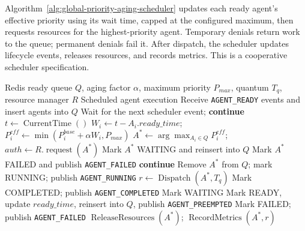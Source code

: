 Algorithm~\ref{alg:global-priority-aging-scheduler} updates each ready agent's effective priority using its wait time, capped at the configured maximum, then requests resources for the highest-priority agent. Temporary denials return work to the queue; permanent denials fail it. After dispatch, the scheduler updates lifecycle events, releases resources, and records metrics. This is a cooperative scheduler specification.
\vspace{\baselineskip}
\begin{algorithm}[H]
\caption{Global Priority-Aging Cooperative Agent Scheduler}

\label{alg:global-priority-aging-scheduler}
\begin{algorithmic}[1]
\Require Redis ready queue $Q$, aging factor $\alpha$, maximum priority $P_{max}$, quantum $T_q$, resource manager $R$
\Ensure Scheduled agent execution
    \State Receive \texttt{AGENT\_READY} events and insert agents into $Q$
     \State Wait for the next scheduler event; \textbf{continue} \EndIf
    \State $t\gets\operatorname{CurrentTime}()$
        \State $W_i\gets t-A_i.ready\_time$; $P_i^{eff}\gets\min(P_i^{base}+\alpha W_i,P_{max})$
    \EndFor
    \State $A^*\gets\arg\max_{A_i\in Q}P_i^{eff}$; $auth\gets R.\operatorname{request}(A^*)$
         \State Mark $A^*$ WAITING and reinsert into $Q$
        \Else \State Mark $A^*$ FAILED and publish \texttt{AGENT\_FAILED} \EndIf
        \State \textbf{continue}
    \EndIf
    \State Remove $A^*$ from $Q$; mark RUNNING; publish \texttt{AGENT\_RUNNING}
    \State $r\gets\operatorname{Dispatch}(A^*,T_q)$
     \State Mark COMPLETED; publish \texttt{AGENT\_COMPLETED}
     \State Mark WAITING
     \State Mark READY, update $ready\_time$, reinsert into $Q$, publish \texttt{AGENT\_PREEMPTED}
    \Else \State Mark FAILED; publish \texttt{AGENT\_FAILED}
    \EndIf
    \State $\operatorname{ReleaseResources}(A^*)$; $\operatorname{RecordMetrics}(A^*,r)$
\EndWhile
\end{algorithmic}
\end{algorithm}
